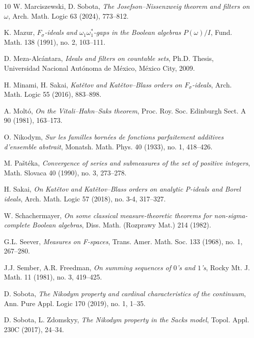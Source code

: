 \documentclass[a4paper,11pt,fleqn]{amsart}
\theoremstyle{definition}
\theoremstyle{remark}
\numberwithin{equation}{section}
\begin{document}
\begin{thebibliography}{10}
 W. Marciszewski, D. Sobota, \textit{The Josefson--Nissenzweig theorem and filters on $\omega$}, Arch. Math. Logic 63 (2024), 773--812.

 K. Mazur, \textit{$F_\sigma$-ideals and $\omega_1\omega_1^*$-gaps in the Boolean algebras $P(\omega)/I$}, Fund. Math. 138 (1991), no. 2, 103--111.

 D. Meza-Alc\'antara, \textit{Ideals and filters on countable sets}, Ph.D. Thesis, Universidad Nacional Aut\'onoma de M\'exico, M\'exico City, 2009.

 H. Minami, H. Sakai, \textit{Kat\v{e}tov and Kat\v{e}tov--Blass orders on $F_\sigma$-ideals}, Arch. Math. Logic 55 (2016), 883--898.

 A. Molt\'o, \textit{On the Vitali--Hahn--Saks theorem}, Proc. Roy. Soc. Edinburgh Sect. A 90 (1981), 163--173.

 O. Nikodym, \textit{Sur les familles born\'ees de fonctions parfaitement additives d'ensemble abstrait}, Monatsh. Math. Phys. 40 (1933), no. 1, 418--426.

 M. Pa\v{s}t\'{e}ka, \textit{Convergence of series and submeasures of the set of positive integers}, Math. Slovaca 40 (1990), no. 3, 273--278.

 H. Sakai, \textit{On Kat\v{e}tov and Kat\v{e}tov--Blass orders on analytic P-ideals and Borel ideals}, Arch. Math. Logic 57 (2018), no. 3-4, 317--327.

 W. Schachermayer, \textit{On some classical measure-theoretic theorems for non-sigma-complete Boolean algebras}, Diss. Math. (Rozprawy Mat.) 214 (1982).


 G.L. Seever, \textit{Measures on F-spaces}, Trans. Amer. Math. Soc. 133 (1968), no. 1, 267--280.

 J.J. Sember, A.R. Freedman, \textit{On summing sequences of $0$'s and $1$'s}, Rocky Mt. J. Math. 11 (1981), no. 3, 419--425.

 D. Sobota, \textit{The Nikodym property and cardinal characteristics of the continuum}, Ann. Pure Appl. Logic 170 (2019), no. 1, 1--35.

 D. Sobota, L. Zdomskyy, \textit{The Nikodym property in the Sacks model}, Topol. Appl. 230C (2017), 24--34.


\end{thebibliography}
\end{document}

